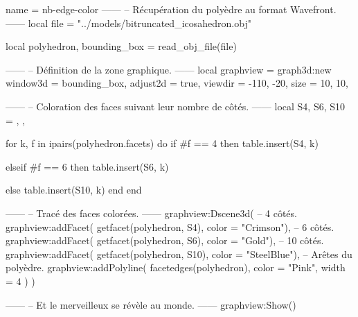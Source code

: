 \documentclass{standalone}
\begin{document}
\begin{luadraw}{name = nb-edge-color}
------
-- Récupération du polyèdre au format Wavefront.
------
local file = "../models/bitruncated_icosahedron.obj"

local polyhedron, bounding_box = read_obj_file(file)

------
-- Définition de la zone graphique.
------
local graphview = graph3d:new{
  window3d = bounding_box,
  adjust2d = true,
  viewdir  = {-110, -20},
  size     = {10, 10},
}

------
-- Coloration des faces suivant leur nombre de côtés.
------
local S4, S6, S10 = {}, {}, {}

for k, f in ipairs(polyhedron.facets) do
  if #f == 4 then
    table.insert(S4, k)

  elseif #f == 6 then
    table.insert(S6, k)

  else
    table.insert(S10, k)
  end
end

------
-- Tracé des faces colorées.
------
graphview:Dscene3d(
-- 4 côtés.
  graphview:addFacet(
    getfacet(polyhedron, S4),
    {color = "Crimson"}),
-- 6 côtés.
  graphview:addFacet(
    getfacet(polyhedron, S6),
    {color = "Gold"}),
-- 10 côtés.
  graphview:addFacet(
    getfacet(polyhedron, S10),
    {color = "SteelBlue"}),
-- Arêtes du polyèdre.
  graphview:addPolyline(
    facetedges(polyhedron),
    {
      color = "Pink",
      width = 4
    })
)

------
-- Et le merveilleux se révèle au monde.
------
graphview:Show()
\end{luadraw}
\end{document}
